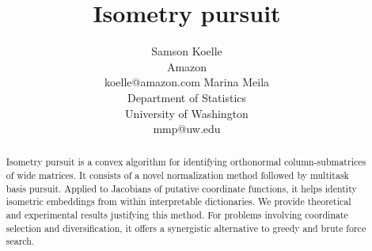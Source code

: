 \documentclass{article}
\title{Isometry pursuit}
\author{%
  Samson Koelle \\
  Amazon  \\
  koelle@amazon.com
  \And
  Marina Meila \\
  Department of Statistics\\
  University of Washington \\
  mmp@uw.edu
}
\begin{document}
\maketitle

\begin{abstract}
Isometry pursuit is a convex algorithm for identifying orthonormal column-submatrices of wide matrices.
It consists of a novel normalization method followed by multitask basis pursuit.
Applied to Jacobians of putative coordinate functions, it helps identity isometric embeddings from within interpretable dictionaries.
We provide theoretical and experimental results justifying this method.
For problems involving coordinate selection and diversification, it offers a synergistic alternative to greedy and brute force search.
\end{abstract}


%
%
%
%
%

\newpage

%

\newpage


\end{document}

